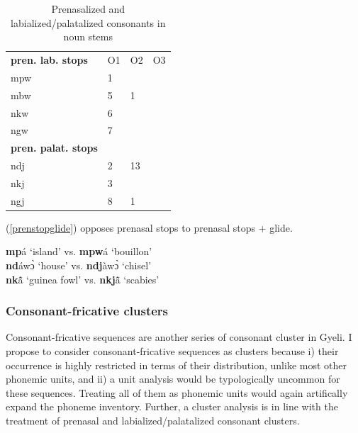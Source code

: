 \begin{table}
\centering
\begin{tabular}{l|lll}
 \midrule
{\bfseries pren. lab. stops}  & O1 & O2  & O3   \\
                         mpw &  1  &  &  \\
                         mbw &  5  & 1 &  \\
                         nkw &  6  &  &   \\
                         ngw  &  7  &  &   \\  \midrule
{\bfseries pren. palat. stops}  &  &  &   \\
                            ndj  &  2  & 13  &   \\ 
			    nkj  &  3 &  &   \\
                           ngj  &   8 & 1 &   \\    
 \midrule
\end{tabular}
\caption{Prenasalized and labialized/palatalized consonants in noun stems}
\label{Tab:PrenCons}
\end{table}

\noindent (\ref{prenstopglide}) opposes prenasal stops to prenasal stops + glide.

\begin{exe} \ex \label{prenstopglide}
{\bfseries mp}á `island' vs. {\bfseries mpw}á `bouillon' \\
{\bfseries nd}áwɔ̀ `house' vs. {\bfseries ndj}àwɔ̀ `chisel' \\
{\bfseries nk}ã̂ `guinea fowl' vs. {\bfseries nkj}ã̂ `scabies' 
\end{exe}







\subsubsection{Consonant-fricative clusters}
\label{sec:Affricates}

Consonant-fricative sequences are another series of consonant cluster in Gyeli. 
I propose to consider consonant-fricative sequences as clusters because i) their occurrence is highly restricted in terms of their distribution, unlike most other phonemic units, and ii) a unit analysis would be typologically uncommon for these sequences. Treating all of them as phonemic units would again artifically expand the phoneme inventory. Further, a cluster analysis is in line with the treatment of prenasal and labialized/palatalized consonant clusters.

